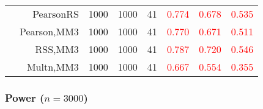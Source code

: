 \documentclass[
]{article}
\begin{document}
\begin{table}[H]
{\begin{tabular}[t]{lrrrrrrr}
\hspace{1em} & PearsonRS & 1000 & 1000 & 41 & \textcolor{red}{0.774} & \textcolor{red}{0.678} & \textcolor{red}{0.535}\\

\hspace{1em} & Pearson,MM3 & 1000 & 1000 & 41 & \textcolor{red}{0.770} & \textcolor{red}{0.671} & \textcolor{red}{0.511}\\

\hspace{1em} & RSS,MM3 & 1000 & 1000 & 41 & \textcolor{red}{0.787} & \textcolor{red}{0.720} & \textcolor{red}{0.546}\\

\hspace{1em} & Multn,MM3 & 1000 & 1000 & 41 & \textcolor{red}{0.667} & \textcolor{red}{0.554} & \textcolor{red}{0.355}\\
\bottomrule
\end{tabular}}
\endgroup{}
\end{table}

\hypertarget{power-n3000}{%
\subsubsection{\texorpdfstring{Power
(\(n=3000\))}{Power (n=3000)}}\label{power-n3000}}
\end{document}
